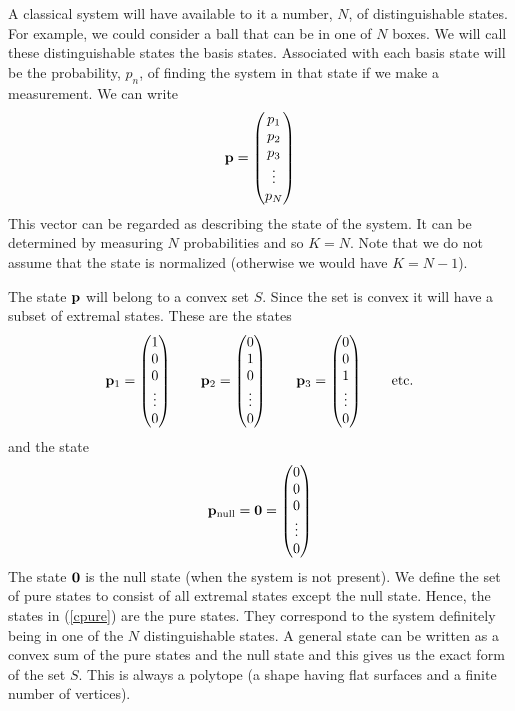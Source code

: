 \documentclass[12pt]{article}
\begin{document}
A classical system will have available to it a number, $N$, of distinguishable
states.  For example, we could consider a ball that can be in one of $N$
boxes.  We will call these distinguishable states the basis states.
Associated with each basis state will be the probability, $p_n$, of finding the
system in that state if we make a measurement. We can write
\begin{equation}
  {\bf p} = \left(
  \begin{matrix} p_1 \\ p_2 \\ p_3 \\ \vdots \\ p_N \end{matrix} \right)
\end{equation}
This vector can be regarded as describing the state of the system. It
can be determined by measuring $N$ probabilities and so $K=N$.
Note that we do not assume that the state is normalized (otherwise we
would have $K=N-1$).

The state ${\bf p}$ will belong to a convex set $S$.  Since the set is
convex it will have a subset of extremal states. These are the states
\begin{equation}\label{cpure}
{\bf p}_1= \left(
\begin{matrix} 1 \\ 0 \\ 0 \\ \vdots \\ 0 \end{matrix} \right) \qquad
{\bf p}_2= \left(
\begin{matrix} 0 \\ 1 \\ 0 \\ \vdots \\ 0 \end{matrix} \right) \qquad
{\bf p}_3= \left(
\begin{matrix} 0 \\ 0 \\ 1 \\ \vdots \\ 0 \end{matrix} \right) \qquad
{\rm etc.}
\end{equation}
and the state
\begin{equation}
{\bf p}_{\rm null}= {\bf 0} =
\left( \begin{matrix} 0 \\ 0 \\ 0 \\ \vdots \\ 0 \end{matrix} \right)
\end{equation}
The state ${\bf 0}$ is the null state (when the system is not present).
We define the set of pure states to consist of all extremal states
except the null state.  Hence, the states in (\ref{cpure}) are the pure
states.  They correspond to the system definitely being in one of the
$N$ distinguishable states.  A general state can be written as a convex
sum of the pure states and the null state and this gives us the exact
form of the set $S$.  This is always a polytope (a shape having flat
surfaces and a finite number of vertices).
\end{document}
